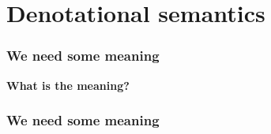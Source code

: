 \section{Denotational semantics}

\begin{frame}
    \frametitle{We need some meaning}

    \centering

    \await
    \huge
    \textbf{What is the meaning?}

\end{frame}

\begin{frame}
    \frametitle{We need some meaning}

    \centering


\end{frame}

